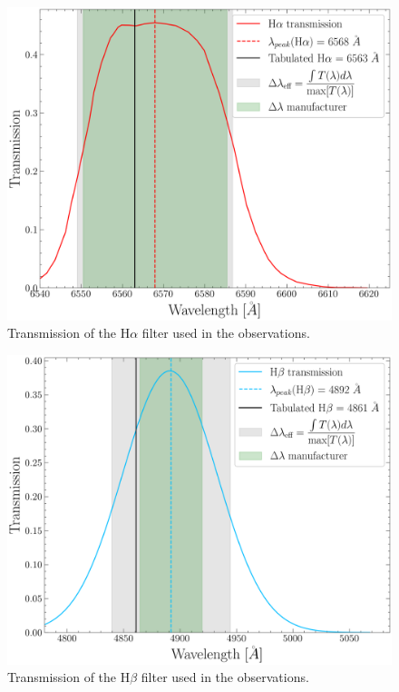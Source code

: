 \documentclass[fleqn,usenatbib]{mnras}
\begin{document}
\begin{figure}\centering
	\includegraphics[width=0.95\columnwidth]{Ha_transmission.png}
    \caption{Transmission of the H$\alpha$ filter used in the observations.}
    \label{fig:Ha_transmission}
\end{figure}

\begin{figure}\centering
	\includegraphics[width=0.95\columnwidth]{Hb_transmission.png}
    \caption{Transmission of the H$\beta$ filter used in the observations.}
    \label{fig:Hb_transmission}
\end{figure}




 


\label{lastpage}
\end{document}
